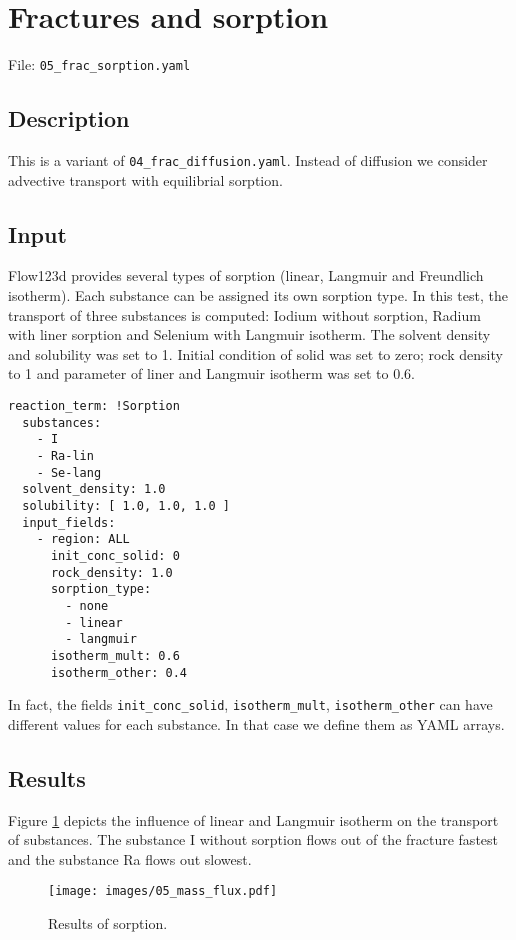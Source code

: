 \section{Fractures and sorption}\label{fractures-and-sorption}

File: \texttt{05\_frac\_sorption.yaml}

\subsection{Description}\label{description}

This is a variant of \texttt{04\_frac\_diffusion.yaml}. Instead of
diffusion we consider advective transport with equilibrial sorption.

\subsection{Input}\label{input}

Flow123d provides several types of sorption (linear, Langmuir and
Freundlich isotherm). Each substance can be assigned its own sorption
type. In this test, the transport of three substances is computed:
Iodium without sorption, Radium with liner sorption and Selenium with
Langmuir isotherm. The solvent density and solubility was set to 1.
Initial condition of solid was set to zero; rock density to 1 and
parameter of liner and Langmuir isotherm was set to 0.6.

\begin{verbatim}
reaction_term: !Sorption
  substances:
    - I
    - Ra-lin
    - Se-lang
  solvent_density: 1.0
  solubility: [ 1.0, 1.0, 1.0 ]
  input_fields:
    - region: ALL
      init_conc_solid: 0
      rock_density: 1.0
      sorption_type:
        - none           
        - linear           
        - langmuir
      isotherm_mult: 0.6          
      isotherm_other: 0.4
\end{verbatim}

In fact, the fields \texttt{init\_conc\_solid}, \texttt{isotherm\_mult},
\texttt{isotherm\_other} can have different values for each substance.
In that case we define them as YAML arrays.

\subsection{Results}\label{results}

Figure \ref{fig:sorp_res} depicts the influence of linear and Langmuir
isotherm on the transport of substances. The substance I without
sorption flows out of the fracture fastest and the substance Ra flows
out slowest.

\begin{figure}[htbp]
\centering
\texttt{[image: images/05\_mass\_flux.pdf]}
\caption{Results of sorption.\label{fig:sorp_res}}
\end{figure}
